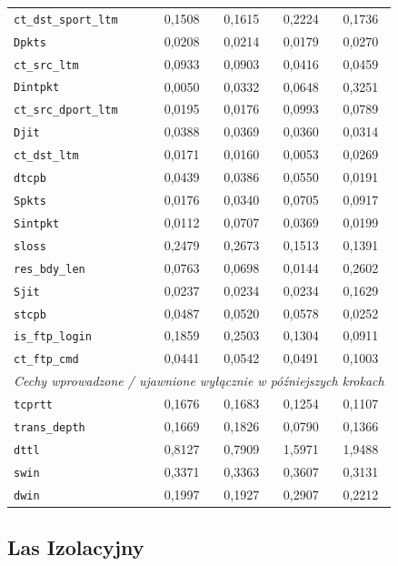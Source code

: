 \documentclass[12pt,twoside]{article}
\begin{document}
\begin{table}[htbp]
\begin{tabular}{|l|c|c|c|c|}
\texttt{ct\_dst\_sport\_ltm} & 0,1508 & 0,1615 & 0,2224 & 0,1736 \\
\texttt{Dpkts} & 0,0208 & 0,0214 & 0,0179 & 0,0270 \\
\texttt{ct\_src\_ltm} & 0,0933 & 0,0903 & 0,0416 & 0,0459 \\
\texttt{Dintpkt} & 0,0050 & 0,0332 & 0,0648 & 0,3251 \\
\texttt{ct\_src\_dport\_ltm} & 0,0195 & 0,0176 & 0,0993 & 0,0789 \\
\texttt{Djit} & 0,0388 & 0,0369 & 0,0360 & 0,0314 \\
\texttt{ct\_dst\_ltm} & 0,0171 & 0,0160 & 0,0053 & 0,0269 \\
\texttt{dtcpb} & 0,0439 & 0,0386 & 0,0550 & 0,0191 \\
\texttt{Spkts} & 0,0176 & 0,0340 & 0,0705 & 0,0917 \\
\texttt{Sintpkt} & 0,0112 & 0,0707 & 0,0369 & 0,0199 \\
\texttt{sloss} & 0,2479 & 0,2673 & 0,1513 & 0,1391 \\
\texttt{res\_bdy\_len} & 0,0763 & 0,0698 & 0,0144 & 0,2602 \\
\texttt{Sjit} & 0,0237 & 0,0234 & 0,0234 & 0,1629 \\
\texttt{stcpb} & 0,0487 & 0,0520 & 0,0578 & 0,0252 \\
\texttt{is\_ftp\_login} & 0,1859 & 0,2503 & 0,1304 & 0,0911 \\
\texttt{ct\_ftp\_cmd} & 0,0441 & 0,0542 & 0,0491 & 0,1003 \\
\hline
\multicolumn{5}{|c|}{\textit{Cechy wprowadzone / ujawnione wyłącznie w późniejszych krokach}} \\
\hline
\texttt{tcprtt} & 0,1676 & 0,1683 & 0,1254 & 0,1107 \\
\texttt{trans\_depth} & 0,1669 & 0,1826 & 0,0790 & 0,1366 \\
\texttt{dttl} & 0,8127 & 0,7909 & 1,5971 & 1,9488 \\
\texttt{swin} & 0,3371 & 0,3363 & 0,3607 & 0,3131 \\
\texttt{dwin} & 0,1997 & 0,1927 & 0,2907 & 0,2212 \\
\hline
\end{tabular}
\label{tab:feature_weights_regression}
\end{table}

\subsection{Las Izolacyjny}
\end{document}
